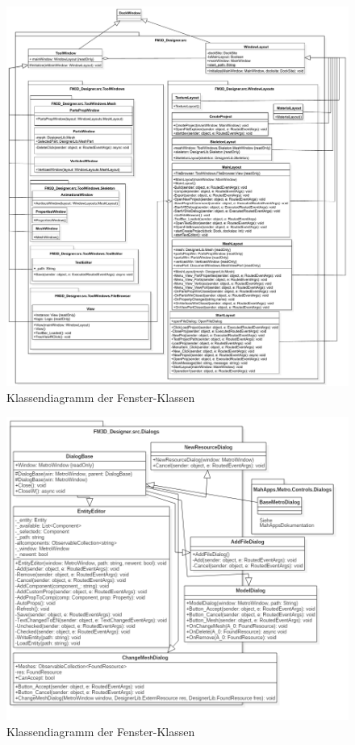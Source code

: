 \begin{figure}
	\begin{center}
		\includegraphics[width=\textwidth]{03unserprogramm/Designer/Fenster.pdf}
		\caption{Klassendiagramm der Fenster-Klassen}\label{windowclass}
	\end{center}
\end{figure}

\begin{figure}
	\begin{center}
		\includegraphics[width=\textwidth]{03unserprogramm/Designer/Dialogs.png}
		\caption{Klassendiagramm der Fenster-Klassen}\label{dialogclass}
	\end{center}
\end{figure}

